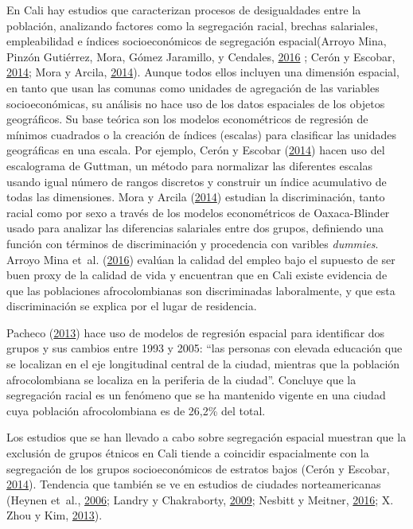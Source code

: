 \documentclass[12pt,a4paper,openany]{book}
\theoremstyle{definition}
\theoremstyle{definition}
\theoremstyle{definition}
\theoremstyle{remark}
\begin{document}
En Cali hay estudios que caracterizan procesos de desigualdades entre la
población, analizando factores como la segregación racial, brechas
salariales, empleabilidad e índices socioeconómicos de segregación
espacial(Arroyo Mina, Pinzón Gutiérrez, Mora, Gómez Jaramillo, y
Cendales, \protect\hyperlink{ref-arroyo_mina_afrocolombianos_2016}{2016}
; Cerón y Escobar, \protect\hyperlink{ref-ceron_indice_2014}{2014}; Mora
y Arcila, \protect\hyperlink{ref-mora_brechas_2014}{2014}). Aunque todos
ellos incluyen una dimensión espacial, en tanto que usan las comunas
como unidades de agregación de las variables socioeconómicas, su
análisis no hace uso de los datos espaciales de los objetos geográficos.
Su base teórica son los modelos econométricos de regresión de mínimos
cuadrados o la creación de índices (escalas) para clasificar las
unidades geográficas en una escala. Por ejemplo, Cerón y Escobar
(\protect\hyperlink{ref-ceron_indice_2014}{2014}) hacen uso del
escalograma de Guttman, un método para normalizar las diferentes escalas
usando igual número de rangos discretos y construir un índice
acumulativo de todas las dimensiones. Mora y Arcila
(\protect\hyperlink{ref-mora_brechas_2014}{2014}) estudian la
discriminación, tanto racial como por sexo a través de los modelos
econométricos de Oaxaca-Blinder usado para analizar las diferencias
salariales entre dos grupos, definiendo una función con términos de
discriminación y procedencia con varibles \emph{dummies}. Arroyo Mina
et~al. (\protect\hyperlink{ref-arroyo_mina_afrocolombianos_2016}{2016})
evalúan la calidad del empleo bajo el supuesto de ser buen proxy de la
calidad de vida y encuentran que en Cali existe evidencia de que las
poblaciones afrocolombianas son discriminadas laboralmente, y que esta
discriminación se explica por el lugar de residencia.

Pacheco (\protect\hyperlink{ref-PACHECO2013121}{2013}) hace uso de
modelos de regresión espacial para identificar dos grupos y sus cambios
entre 1993 y 2005: ``las personas con elevada educación que se localizan
en el eje longitudinal central de la ciudad, mientras que la población
afrocolombiana se localiza en la periferia de la ciudad''. Concluye que
la segregación racial es un fenómeno que se ha mantenido vigente en una
ciudad cuya población afrocolombiana es de 26,2\% del total.

Los estudios que se han llevado a cabo sobre segregación espacial
muestran que la exclusión de grupos étnicos en Cali tiende a coincidir
espacialmente con la segregación de los grupos socioeconómicos de
estratos bajos (Cerón y Escobar,
\protect\hyperlink{ref-ceron_indice_2014}{2014}). Tendencia que también
se ve en estudios de ciudades norteamericanas (Heynen et~al.,
\protect\hyperlink{ref-heynen_political_2006}{2006}; Landry y
Chakraborty, \protect\hyperlink{ref-landry_street_2009}{2009}; Nesbitt y
Meitner, \protect\hyperlink{ref-nesbitt_exploring_2016}{2016}; X. Zhou y
Kim, \protect\hyperlink{ref-zhou_social_2013}{2013}).
\end{document}
